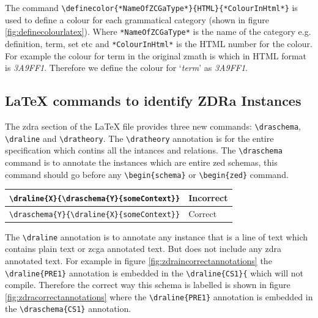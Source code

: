 The command \verb|\definecolor{*NameOfZCGaType*}{HTML}{*ColourInHtml*}| is used
to define a colour for each grammatical category (shown in figure
\ref{fig:definecolourlatex}). Where \verb|*NameOfZCGaType*| is the name of the
category e.g. definition, term, set etc and \verb|*ColourInHtml*| is the HTML
number for the colour. For example the colour for term in the original
\gls{zmath} is  which in HTML format is \emph{3A9FF1}.
Therefore we define the colour for `\emph{term}' as \emph{3A9FF1}.

\subsection{\LaTeX{} commands to identify ZDRa Instances}

The \gls{zdra} section of the \LaTeX{} file provides three new commands:
\verb|\draschema|, \verb|\draline| and \verb|\dratheory|. The \verb|\dratheory|
annotation is for the entire specification which contins all the intances and
relations. The \verb|\draschema| command is to annotate the instances which are
entire zed schemas, this command should go before any \verb|\begin{schema}| or
\verb|\begin{zed}| command.

\begin{tabular}{|l | l|}
\hline
\verb|\draline{X}{\draschema{Y}{someContext}}| & {\color{set}Incorrect} \\
\hline
\verb|\draschema{Y}{\draline{X}{someContext}}| & {\color{set}Correct} \\
\hline
\end{tabular}

 The \verb|\draline| annotation is to annotate any instance that is a line of
 text which contains plain text or \gls{zcga} annotated text. But does not
 include any \gls{zdra} annotated text. For example in figure
 \ref{fig:zdraincorrectannotations} the \verb|\draline{PRE1}| annotation is
 embedded in the \verb|\draline{CS1}{| which will not compile. Therefore the
 correct way this schema is labelled is shown in figure
 \ref{fig:zdracorrectannotations} where the \verb|\draline{PRE1}| annotation is
 embedded in the \verb|\draschema{CS1}| annotation.

